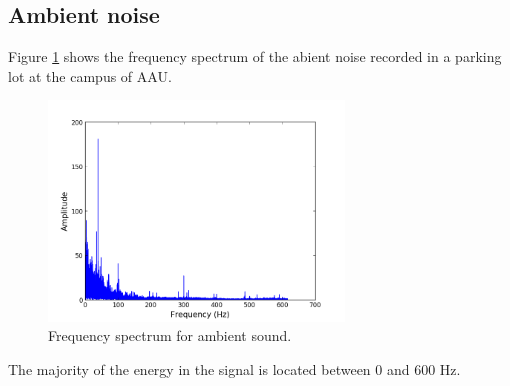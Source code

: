 \subsection{Ambient noise}
Figure \ref{fig:ambient} shows the frequency spectrum of the abient noise recorded in a parking lot at the campus of AAU.
\begin{figure}[H]
\centering
\includegraphics[width=0.7\textwidth]{figures/freqanal/ambient.png}
\caption{Frequency spectrum for ambient sound.}
\label{fig:ambient}
\end{figure}
The majority of the energy in the signal is located between 0 and 600 Hz.











